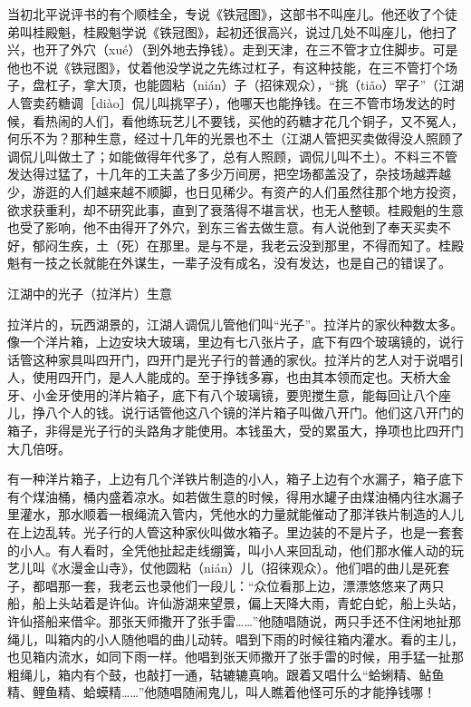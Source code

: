 \documentclass[12pt,UTF8]{ctexbook}
\begin{document}
当初北平说评书的有个顺桂全，专说《铁冠图》，这部书不叫座儿。他还收了个徒弟叫桂殿魁，桂殿魁学说《铁冠图》，起初还很高兴，说过几处不叫座儿，他扫了兴，也开了外穴（xué）（到外地去挣钱）。走到天津，在三不管才立住脚步。可是他也不说《铁冠图》，仗着他没学说之先练过杠子，有这种技能，在三不管打个场子，盘杠子，拿大顶，也能圆粘（nián）子（招徕观众），“挑（tiǎo）罕子”（江湖人管卖药糖调［diào］侃儿叫挑罕子），他哪天也能挣钱。在三不管市场发达的时候，看热闹的人们，看他练玩艺儿不要钱，买他的药糖才花几个铜子，又不冤人，何乐不为？那种生意，经过十几年的光景也不土（江湖人管把买卖做得没人照顾了调侃儿叫做土了；如能做得年代多了，总有人照顾，调侃儿叫不土）。不料三不管发达得过猛了，十几年的工夫盖了多少万间房，把空场都盖没了，杂技场越弄越少，游逛的人们越来越不顺脚，也日见稀少。有资产的人们虽然往那个地方投资，欲求获重利，却不研究此事，直到了衰落得不堪言状，也无人整顿。桂殿魁的生意也受了影响，他不由得开了外穴，到东三省去做生意。有人说他到了奉天买卖不好，郁闷生疾，土（死）在那里。是与不是，我老云没到那里，不得而知了。桂殿魁有一技之长就能在外谋生，一辈子没有成名，没有发达，也是自己的错误了。





江湖中的光子（拉洋片）生意


拉洋片的，玩西湖景的，江湖人调侃儿管他们叫“光子”。拉洋片的家伙种数太多。像一个洋片箱，上边安块大玻璃，里边有七八张片子，底下有四个玻璃镜的，说行话管这种家具叫四开门，四开门是光子行的普通的家伙。拉洋片的艺人对于说唱引人，使用四开门，是人人能成的。至于挣钱多寡，也由其本领而定也。天桥大金牙、小金牙使用的洋片箱子，底下有八个玻璃镜，要兜搅生意，能每回让八个座儿，挣八个人的钱。说行话管他这八个镜的洋片箱子叫做八开门。他们这八开门的箱子，非得是光子行的头路角才能使用。本钱虽大，受的累虽大，挣项也比四开门大几倍呀。

有一种洋片箱子，上边有几个洋铁片制造的小人，箱子上边有个水漏子，箱子底下有个煤油桶，桶内盛着凉水。如若做生意的时候，得用水罐子由煤油桶内往水漏子里灌水，那水顺着一根绳流入管内，凭他水的力量就能催动了那洋铁片制造的人儿在上边乱转。光子行的人管这种家伙叫做水箱子。里边装的不是片子，也是一套套的小人。有人看时，全凭他扯起走线绷簧，叫小人来回乱动，他们那水催人动的玩艺儿叫《水漫金山寺》，仗他圆粘（nián）儿（招徕观众）。他们唱的曲儿是死套子，都唱那一套，我老云也录他们一段儿：“众位看那上边，漂漂悠悠来了两只船，船上头站着是许仙。许仙游湖来望景，偏上天降大雨，青蛇白蛇，船上头站，许仙搭船来借伞。那张天师撒开了张手雷……”他随唱随说，两只手还不住闲地扯那绳儿，叫箱内的小人随他唱的曲儿动转。唱到下雨的时候往箱内灌水。看的主儿，也见箱内流水，如同下雨一样。他唱到张天师撒开了张手雷的时候，用手猛一扯那粗绳儿，箱内有个鼓，也敲打一通，轱辘辘真响。跟着又唱什么“蛤蜊精、鲇鱼精、鲤鱼精、蛤蟆精……”他随唱随闹鬼儿，叫人瞧着他怪可乐的才能挣钱哪！
\end{document}

